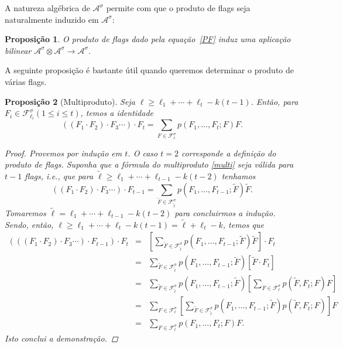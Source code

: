 \documentclass{amsart}
\theoremstyle{theorem}
\newtheorem{proposicao}{Proposi\c{c}\~{a}o}[section]
\theoremstyle{definition}
\theoremstyle{remark}
\numberwithin{equation}{section}
\begin{document}
A natureza alg\'{e}brica de $\mathcal{A}^{\sigma}$ permite com que o produto de flags seja naturalmente induzido em $\mathcal{A}^{\sigma}$:
\begin{proposicao}
  O produto de flags dado pela equa\c{c}\~{a}o~\ref{PF} induz uma aplica\c{c}\~{a}o bilinear $\mathcal{A}^{\sigma} \otimes \mathcal{A}^{\sigma}\rightarrow \mathcal{A}^{\sigma}$.
\end{proposicao}

A seguinte proposi\c{c}\~{a}o \'{e} bastante \'{u}til quando queremos determinar o produto de v\'{a}rias flags.
\begin{proposicao}[Multiproduto]
  Seja $\ell \geq \ell_1 + \cdots + \ell_t - k(t-1)$. Ent\~{a}o, para $F_i \in \mathcal{F}^{\sigma}_{\ell_i} (1\leq i \leq t)$, temos a identidade
      \begin{equation}\label{multi}
        ((F_1 \cdot F_2) \cdot F_3 \cdots) \cdot F_t = \sum_{F\in\mathcal{F}^{\sigma}_{\ell}} p(F_1,\ldots, F_t;F) F.
      \end{equation}
      \begin{proof}
        Provemos por indu\c{c}\~{a}o em $t$. O caso $t=2$ corresponde a defini\c{c}\~{a}o do produto de flags. Suponha que a f\'{o}rmula do multiproduto \ref{multi} seja v\'{a}lida para $t-1$ flags, i.e., que para $\tilde{\ell} \geq \ell_1 + \cdots + \ell_{t-1} - k(t-2)$ tenhamos
        \begin{equation*}
        ((F_1 \cdot F_2) \cdot F_3 \cdots) \cdot F_{t-1} = \sum_{\tilde{F}\in\mathcal{F}^{\sigma}_{\tilde{\ell}}} p(F_1,\ldots, F_{t-1};\tilde{F}) \tilde{F} .
      \end{equation*}
      Tomaremos $\tilde{\ell} = \ell_1 + \cdots + \ell_{t-1} - k(t-2)$ para concluirmos a indu\c{c}\~{a}o.
      Sendo, ent\~{a}o, $\ell \geq \ell_1 + \cdots + \ell_{t} - k(t-1) = \tilde{\ell} + \ell_{t} - k$, temos que
      \begin{equation*}
        \begin{array}{rcl}
          (((F_1 \cdot F_2) \cdot F_3 \cdots) \cdot F_{t-1}) \cdot F_{t} &=& \displaystyle{\left[ \sum_{\tilde{F}\in\mathcal{F}^{\sigma}_{\tilde{\ell}}} p(F_1,\ldots, F_{t-1};\tilde{F}) \tilde{F}\right] \cdot F_{t}} \\
          &=& \displaystyle{ \sum_{\tilde{F}\in\mathcal{F}^{\sigma}_{\tilde{\ell}}} p(F_1,\ldots, F_{t-1};\tilde{F}) \left[ \tilde{F}  \cdot F_{t} \right] }\\
          &=& \displaystyle{ \sum_{\tilde{F}\in\mathcal{F}^{\sigma}_{\tilde{\ell}}} p(F_1,\ldots, F_{t-1};\tilde{F}) \left[ \sum_{F\in\mathcal{F}^{\sigma}_{\ell}} p(\tilde{F},F_t;F) F \right] }\\
          &=& \displaystyle{ \sum_{F\in\mathcal{F}^{\sigma}_{\ell}} \left[ \sum_{\tilde{F}\in\mathcal{F}^{\sigma}_{\tilde{\ell}}} p(F_1,\ldots, F_{t-1};\tilde{F})  p(\tilde{F},F_t;F) \right] F  }\\
          &=& \displaystyle{\sum_{F\in\mathcal{F}^{\sigma}_{\ell}} p(F_1,\ldots, F_t;F) F }.
        \end{array}
      \end{equation*}
      Isto conclui a demonstra\c{c}\~{a}o.
      \end{proof}
\end{proposicao}
\end{document}
